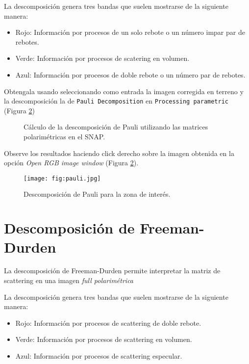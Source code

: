La descomposición genera tres bandas que suelen mostrarse de la siguiente manera:

\begin{itemize}
    \item Rojo: Información por procesos de un solo rebote o un número impar par de rebotes.
    \item Verde: Información por procesos de scatering en volumen.
    \item Azul: Información por procesos de doble rebote o un número par de rebotes.
\end{itemize}

Obtengala usando  seleccionando como entrada la imagen corregida en terreno y la descomposición la de \texttt{Pauli Decomposition} en \texttt{Processing parametric} (Figura \ref{fig:pauli})

\begin{figure}[h!]
    \centering
    \hspace{1cm}
    \caption{Cálculo de la descomposición de Pauli utilizando las matrices polarimétricas en el SNAP.}
    \label{fig:pauli}
\end{figure}

Observe los resultados haciendo click derecho sobre la imagen obtenida en la opción \emph{Open RGB image window} (Figura \ref{fig:pauli}).

\begin{figure}[h!]
    \centering
    \texttt{[image: fig:pauli.jpg]}
    \caption{Descomposición de Pauli para la zona de interés.}
    \label{fig:pauli}
\end{figure}

\section{Descomposición de Freeman-Durden}

La descomposición de Freeman-Durden permite interpretar la matriz de scattering en una imagen \emph{full polarimétrica}

La descomposición genera tres bandas que suelen mostrarse de la siguiente manera:

\begin{itemize}
    \item Rojo: Información por procesos de scattering  de doble rebote.
    \item Verde: Información por procesos de scattering en volumen.
    \item Azul: Información por procesos de scattering especular.
\end{itemize}

